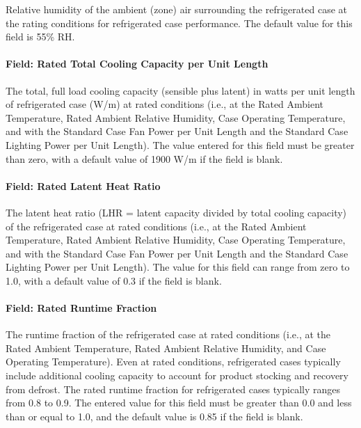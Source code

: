 Relative humidity of the ambient (zone) air surrounding the refrigerated case at the rating conditions for refrigerated case performance. The default value for this field is 55\% RH.

\paragraph{Field: Rated Total Cooling Capacity per Unit Length}\label{field-rated-total-cooling-capacity-per-unit-length}

The total, full load cooling capacity (sensible plus latent) in watts per unit length of refrigerated case (W/m) at rated conditions (i.e., at the Rated Ambient Temperature, Rated Ambient Relative Humidity, Case Operating Temperature, and with the Standard Case Fan Power per Unit Length and the Standard Case Lighting Power per Unit Length). The value entered for this field must be greater than zero, with a default value of 1900 W/m if the field is blank.

\paragraph{Field: Rated Latent Heat Ratio}\label{field-rated-latent-heat-ratio}

The latent heat ratio (LHR = latent capacity divided by total cooling capacity) of the refrigerated case at rated conditions (i.e., at the Rated Ambient Temperature, Rated Ambient Relative Humidity, Case Operating Temperature, and with the Standard Case Fan Power per Unit Length and the Standard Case Lighting Power per Unit Length). The value for this field can range from zero to 1.0, with a default value of 0.3 if the field is blank.

\paragraph{Field: Rated Runtime Fraction}\label{field-rated-runtime-fraction}

The runtime fraction of the refrigerated case at rated conditions (i.e., at the Rated Ambient Temperature, Rated Ambient Relative Humidity, and Case Operating Temperature). Even at rated conditions, refrigerated cases typically include additional cooling capacity to account for product stocking and recovery from defrost. The rated runtime fraction for refrigerated cases typically ranges from 0.8 to 0.9. The entered value for this field must be greater than 0.0 and less than or equal to 1.0, and the default value is 0.85 if the field is blank.

